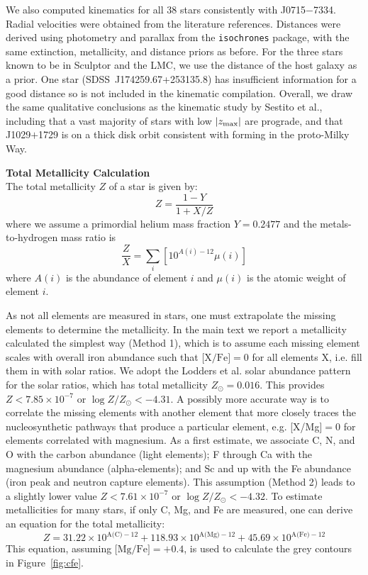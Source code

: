 \documentclass{natureprintstyle}
\newcommand{\code}[1]{\texttt{#1}\xspace}
\newcommand{\logzzsun}{\ensuremath{\log Z/Z_\odot}\xspace}
\newcommand{\umpstar}{J0715$-$7334\xspace}
\newcommand{\caffaustar}{J1029$+$1729\xspace}
\begin{document}
We also computed kinematics for all 38 stars consistently with \umpstar.
Radial velocities were obtained from the literature references.
Distances were derived using photometry and parallax from the \code{isochrones} package, with the same extinction, metallicity, and distance priors as before.
For the three stars known to be in Sculptor and the LMC, we use the distance of the host galaxy as a prior.
One star (SDSS~J174259.67+253135.8) has insufficient information for a good distance so is not included in the kinematic compilation.
Overall, we draw the same qualitative conclusions as the kinematic study by Sestito et al.\cite{Sestito2019}, including that a vast majority of stars with low $|z_{\rm max}|$ are prograde, and that \caffaustar is on a thick disk orbit consistent with forming in the proto-Milky Way.

\vspace{1mm}
\noindent
{\bf Total Metallicity Calculation}
\\
\noindent
The total metallicity $Z$ of a star is given by\cite{Lagae2023}:
\begin{equation*}
    Z = \frac{1 - Y}{1 + X/Z}
\end{equation*}
where we assume a primordial helium mass fraction $Y = 0.2477$\cite{Peimbert2007} and the metals-to-hydrogen mass ratio is
\begin{equation*}
    \frac{Z}{X} = \sum_i \left[10^{A(i)-12} \mu(i)\right]
\end{equation*}
where $A(i)$ is the abundance of element $i$ and $\mu(i)$ is the atomic weight of element $i$.

As not all elements are measured in stars, one must extrapolate the missing elements to determine the metallicity.
In the main text we report a metallicity calculated the simplest way (Method 1), which is to assume each missing element scales with overall iron abundance such that $\mbox{[X/Fe]}=0$ for all elements X, i.e. fill them in with solar ratios.
We adopt the Lodders et al.\cite{Lodders2025} solar abundance pattern for the solar ratios, which has total metallicity $Z_\odot=0.016$.
This provides $Z < 7.85 \times 10^{-7}$ or $\logzzsun < -4.31$.
A possibly more accurate way is to correlate the missing elements with another element that more closely traces the nucleosynthetic pathways that produce a particular element, e.g. [X/Mg]$=0$ for elements correlated with magnesium.
As a first estimate, we associate C, N, and O with the carbon abundance (light elements); F through Ca with the magnesium abundance (alpha-elements); and Sc and up with the Fe abundance (iron peak and neutron capture elements).
This assumption (Method 2\cite{Caffau2024}) leads to a slightly lower value $Z < 7.61 \times 10^{-7}$ or $\logzzsun < -4.32$.
To estimate metallicities for many stars, if only C, Mg, and Fe are measured, one can derive an equation for the total metallicity:
\begin{equation*}
    Z = 31.22 \times 10^{\text{A(C)}-12} + 118.93 \times 10^{\text{A(Mg)}-12} + 45.69 \times 10^{\text{A(Fe)}-12}
\end{equation*}
This equation, assuming $\mbox{[Mg/Fe]}=+0.4$, is used to calculate the grey contours in Figure~\ref{fig:cfe}.
\end{document}
